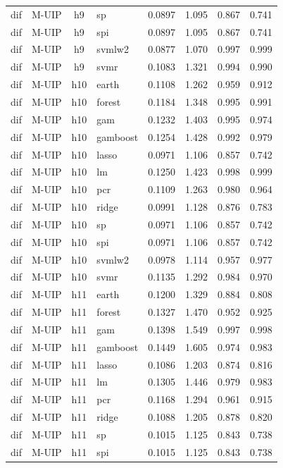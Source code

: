 \begin{ThreePartTable}
\begin{longtable}[t]{llclcccc}
dif & M-UIP & h9 & sp & 0.0897 & 1.095 & 0.867 & 0.741\\
dif & M-UIP & h9 & spi & 0.0897 & 1.095 & 0.867 & 0.741\\
dif & M-UIP & h9 & svmlw2 & 0.0877 & 1.070 & 0.997 & 0.999\\
dif & M-UIP & h9 & svmr & 0.1083 & 1.321 & 0.994 & 0.990\\
\addlinespace
dif & M-UIP & h10 & earth & 0.1108 & 1.262 & 0.959 & 0.912\\
dif & M-UIP & h10 & forest & 0.1184 & 1.348 & 0.995 & 0.991\\
dif & M-UIP & h10 & gam & 0.1232 & 1.403 & 0.995 & 0.974\\
dif & M-UIP & h10 & gamboost & 0.1254 & 1.428 & 0.992 & 0.979\\
dif & M-UIP & h10 & lasso & 0.0971 & 1.106 & 0.857 & 0.742\\
dif & M-UIP & h10 & lm & 0.1250 & 1.423 & 0.998 & 0.999\\
dif & M-UIP & h10 & pcr & 0.1109 & 1.263 & 0.980 & 0.964\\
dif & M-UIP & h10 & ridge & 0.0991 & 1.128 & 0.876 & 0.783\\
dif & M-UIP & h10 & sp & 0.0971 & 1.106 & 0.857 & 0.742\\
dif & M-UIP & h10 & spi & 0.0971 & 1.106 & 0.857 & 0.742\\
dif & M-UIP & h10 & svmlw2 & 0.0978 & 1.114 & 0.957 & 0.977\\
dif & M-UIP & h10 & svmr & 0.1135 & 1.292 & 0.984 & 0.970\\
\addlinespace
dif & M-UIP & h11 & earth & 0.1200 & 1.329 & 0.884 & 0.808\\
dif & M-UIP & h11 & forest & 0.1327 & 1.470 & 0.952 & 0.925\\
dif & M-UIP & h11 & gam & 0.1398 & 1.549 & 0.997 & 0.998\\
dif & M-UIP & h11 & gamboost & 0.1449 & 1.605 & 0.974 & 0.983\\
dif & M-UIP & h11 & lasso & 0.1086 & 1.203 & 0.874 & 0.816\\
dif & M-UIP & h11 & lm & 0.1305 & 1.446 & 0.979 & 0.983\\
dif & M-UIP & h11 & pcr & 0.1168 & 1.294 & 0.961 & 0.915\\
dif & M-UIP & h11 & ridge & 0.1088 & 1.205 & 0.878 & 0.820\\
dif & M-UIP & h11 & sp & 0.1015 & 1.125 & 0.843 & 0.738\\
dif & M-UIP & h11 & spi & 0.1015 & 1.125 & 0.843 & 0.738\\

\end{longtable}
\end{ThreePartTable}
